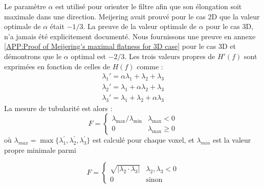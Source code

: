 Le paramètre $\alpha$ est utilisé pour orienter le filtre afin que son élongation soit maximale dans une direction. Meijering avait prouvé pour le cas 2D que la valeur optimale de $\alpha$ était $-1/3$. La preuve de la valeur optimale de $\alpha$ pour le cas 3D, n'a jamais été explicitement documenté. Nous fournissons une preuve en annexe \ref{APP:Proof of Meijering's maximal flatness for 3D case} pour le cas 3D et démontrons que le $\alpha$ optimal est $-2/3$. Les trois valeurs propres de $H'(f)$ sont exprimées en fonction de celles de $H(f)$ comme :
\begin{equation}
  \begin{aligned}
    \nonumber \lambda_1' = \alpha\lambda_1 + \lambda_2 + \lambda_3 \\
    \nonumber \lambda_2' = \lambda_1 + \alpha\lambda_2 + \lambda_3 \\
    \nonumber \lambda_3' = \lambda_1 + \lambda_2 + \alpha\lambda_3
  \end{aligned}
\end{equation}
La mesure de tubularité est alors :
\begin{equation}
\nonumber 
  F =
  \left\{
  \begin{array}{lr}
    \lambda_{\max} / \lambda_{\min}   &  \lambda_{\max} < 0\\
      0 &  \lambda_{\max} \geqslant 0
  \end{array}
  \right.
\end{equation}
où $\lambda_{max} = \max\{\lambda_{1}^{'},\lambda_{2}^{'},\lambda_{3}^{'}\}$ est calculé pour chaque voxel, et $\lambda_{min}$ est la valeur propre minimale parmi 


\begin{equation}
\nonumber
    F =
    \left\{
    \begin{array}{lr}
    
    \sqrt{|\lambda_2 \cdot \lambda_3|}   & \lambda_2, \lambda_3 < 0 \\
    0     & \textrm{sinon}
    \end{array}
    \right.
\end{equation}

